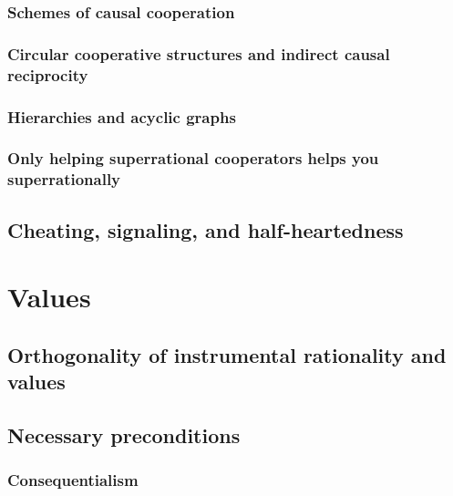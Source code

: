 \documentclass{book}
\begin{document}
\subsection{Schemes of causal cooperation}
\label{Schemes of causal cooperation}

\subsection{Circular cooperative structures and indirect causal reciprocity}
\label{Circular cooperative structures and indirect causal reciprocity}

\subsection{Hierarchies and acyclic graphs}
\label{Hierarchies and acyclic graphs}

\subsection{Only helping superrational cooperators helps you superrationally}
\label{Only helping superrational cooperators helps you superrationally}

\section{Cheating, signaling, and half-heartedness}
\label{Cheating, signaling, and half-heartedness}


\chapter{Values}
\label{Values}

\section{Orthogonality of instrumental rationality and values}
\label{Orthogonality of instrumental rationality and values}

\section{Necessary preconditions}
\label{Necessary preconditions}

\subsection{Consequentialism}
\label{Consequentialism}
\end{document}
